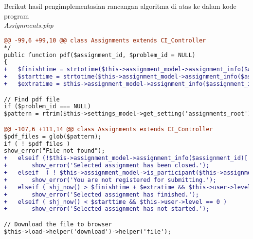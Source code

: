 Berikut hasil pengimplementasian rancangan algoritma di atas ke dalam kode program
~\\
\textit{Assignments.php}
\begin{lstlisting}[language=diff, basicstyle=\ttfamily, frame=single,
columns=fullflexible, keepspaces=true, breaklines=true]
@@ -99,6 +99,10 @@ class Assignments extends CI_Controller
*/
public function pdf($assignment_id, $problem_id = NULL)
{
+   $finishtime = strtotime($this->assignment_model->assignment_info($assignment_id)['finish_time']);
+   $starttime = strtotime($this->assignment_model->assignment_info($assignment_id)['start_time']);
+   $extratime = $this->assignment_model->assignment_info($assignment_id)['extra_time'];

// Find pdf file
if ($problem_id === NULL)
$pattern = rtrim($this->settings_model->get_setting('assignments_root'),'/')."/assignment_{$assignment_id}/*.pdf";

@@ -107,6 +111,14 @@ class Assignments extends CI_Controller
$pdf_files = glob($pattern);
if ( ! $pdf_files )
show_error("File not found");
+   elseif (!$this->assignment_model->assignment_info($assignment_id)['open'] && $this->user->level == 0 )
+       show_error('Selected assignment has been closed.');
+   elseif  ( ! $this->assignment_model->is_participant($this->assignment_model->assignment_info($assignment_id)['participants'],$this->user->username) )
+       show_error('You are not registered for submitting.');
+   elseif ( shj_now() > $finishtime + $extratime && $this->user->level == 0 )
+       show_error('Selected assignment has finished.');
+   elseif ( shj_now() < $starttime && $this->user->level == 0 )
+       show_error('Selected assignment has not started.');

// Download the file to browser
$this->load->helper('download')->helper('file');
\end{lstlisting}

